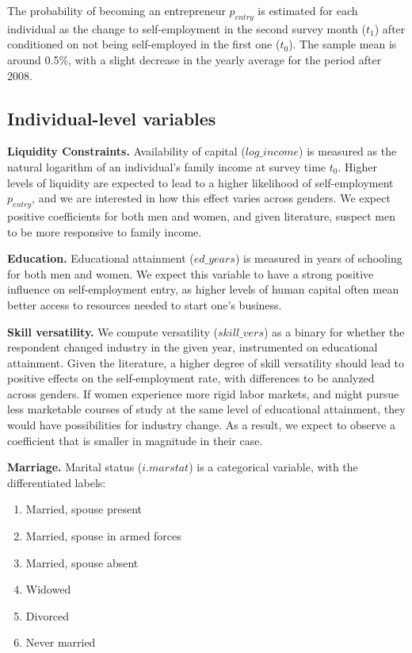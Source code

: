The probability of becoming an entrepreneur $p_{entry}$ is estimated for each individual as the change to self-employment in the second survey month ($t_1$) after conditioned on not being self-employed in the first one ($t_0$). The sample mean is around 0.5\%, with a slight decrease in the yearly average for the period after 2008. 

\subsection{Individual-level variables}

\textbf{Liquidity Constraints.} Availability of capital ($log\_income$) is measured as the natural logarithm of an individual's family income at survey time $t_0$. Higher levels of liquidity are expected to lead to a higher likelihood of self-employment $p_{entry}$, and we are interested in how this effect varies across genders. We expect positive coefficients for both men and women, and given literature, suspect men to be more responsive to family income. 

\textbf{Education.} Educational attainment ($ed\_years$) is measured in years of schooling for both men and women. We expect this variable to have a strong positive influence on self-employment entry, as higher levels of human capital often mean better access to resources needed to start one's business. 

\textbf{Skill versatility.} We compute versatility ($skill\_vers$) as a binary for whether the respondent changed industry in the given year, instrumented on educational attainment. Given the literature, a higher degree of skill versatility should lead to positive effects on the self-employment rate, with differences to be analyzed across genders. If women experience more rigid labor markets, and might pursue less marketable courses of study at the same level of educational attainment, they would have possibilities for industry change. As a result, we expect to observe a coefficient that is smaller in magnitude in their case. 

\textbf{Marriage.}  Marital status ($i.marstat$) is a categorical variable, with the differentiated labels:
\begin{singlespace}
\begin{enumerate}
\item Married, spouse present
\item Married, spouse in armed forces
\item Married, spouse absent
\item Widowed
\item Divorced
\item Never married
\end{enumerate}
\end{singlespace}

